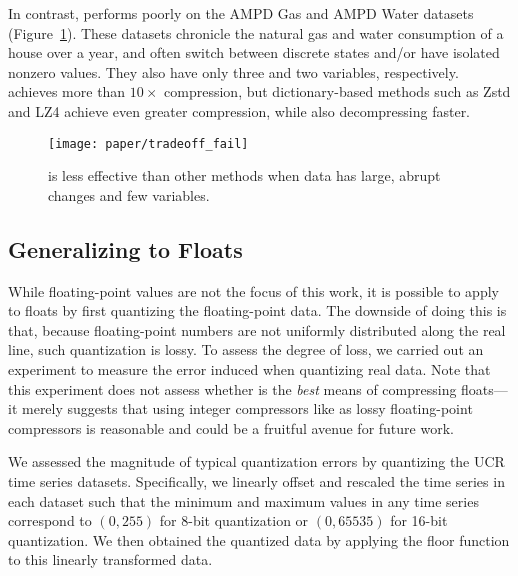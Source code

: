 In contrast, \minesp performs poorly on the AMPD Gas and AMPD Water datasets (Figure~\ref{fig:tradeoff_failure}). These datasets chronicle the natural gas and water consumption of a house over a year, and often switch between discrete states and/or have isolated nonzero values. They also have only three and two variables, respectively. \minesp achieves more than $10\times$ compression, but dictionary-based methods such as Zstd and LZ4 achieve even greater compression, while also decompressing faster.

\begin{figure}[h]
\begin{center}
    \texttt{[image: paper/tradeoff\_fail]}
    \caption{\minesp is less effective than other methods when data has large, abrupt changes and few variables.}
    \label{fig:tradeoff_failure}
\end{center}
\end{figure}

\subsection{Generalizing to Floats} \label{sec:floats}

While floating-point values are not the focus of this work, it is possible to apply \minesp to floats by first quantizing the floating-point data. The downside of doing this is that, because floating-point numbers are not uniformly distributed along the real line, such quantization is lossy. To assess the degree of loss, we carried out an experiment to measure the error induced when quantizing real data. Note that this experiment does not assess whether \minesp is the \textit{best} means of compressing floats---it merely suggests that using integer compressors like \minesp as lossy floating-point compressors is reasonable and could be a fruitful avenue for future work. %

We assessed the magnitude of typical quantization errors by quantizing the UCR time series datasets. Specifically, we linearly offset and rescaled the time series in each dataset such that the minimum and maximum values in any time series correspond to $(0, 255)$ for 8-bit quantization or $(0, 65535)$ for 16-bit quantization. We then obtained the quantized data by applying the floor function to this linearly transformed data.

